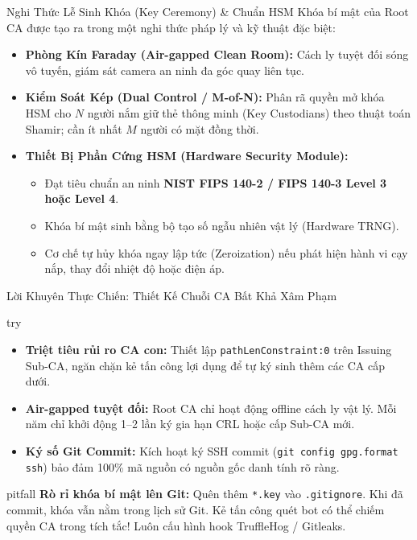 \begin{frame}{Nghi Thức Lễ Sinh Khóa (Key Ceremony) \& Chuẩn HSM}
  Khóa bí mật của Root CA được tạo ra trong một nghi thức pháp lý và kỹ thuật đặc biệt:
  \begin{itemize}\small
    \item \textbf{Phòng Kín Faraday (Air-gapped Clean Room):} Cách ly tuyệt đối sóng vô tuyến, giám sát camera an ninh đa góc quay liên tục.
    \item \textbf{Kiểm Soát Kép (Dual Control / M-of-N):} Phân rã quyền mở khóa HSM cho $N$ người nắm giữ thẻ thông minh (Key Custodians) theo thuật toán Shamir; cần ít nhất $M$ người có mặt đồng thời.
    \item \textbf{Thiết Bị Phần Cứng HSM (Hardware Security Module):}
      \begin{itemize}\footnotesize
        \item Đạt tiêu chuẩn an ninh \textbf{NIST FIPS 140-2 / FIPS 140-3 Level 3 hoặc Level 4}.
        \item Khóa bí mật sinh bằng bộ tạo số ngẫu nhiên vật lý (Hardware TRNG).
        \item Cơ chế tự hủy khóa ngay lập tức (Zeroization) nếu phát hiện hành vi cạy nắp, thay đổi nhiệt độ hoặc điện áp.
      \end{itemize}
  \end{itemize}
\end{frame}

\begin{frame}{Lời Khuyên Thực Chiến: Thiết Kế Chuỗi CA Bất Khả Xâm Phạm}
  \begin{beyond}{try}
    \begin{itemize}\footnotesize
      \item \textbf{Triệt tiêu rủi ro CA con:} Thiết lập \texttt{pathLenConstraint:0} trên Issuing Sub-CA, ngăn chặn kẻ tấn công lợi dụng để tự ký sinh thêm các CA cấp dưới.
      \item \textbf{Air-gapped tuyệt đối:} Root CA chỉ hoạt động offline cách ly vật lý. Mỗi năm chỉ khởi động 1--2 lần ký gia hạn CRL hoặc cấp Sub-CA mới.
      \item \textbf{Ký số Git Commit:} Kích hoạt ký SSH commit (\texttt{git config gpg.format ssh}) bảo đảm 100\% mã nguồn có nguồn gốc danh tính rõ ràng.
    \end{itemize}
  \end{beyond}

  \begin{beyond}{pitfall}
    \footnotesize
    \textbf{Rò rỉ khóa bí mật lên Git:} Quên thêm \texttt{*.key} vào \texttt{.gitignore}. Khi đã commit, khóa vẫn nằm trong lịch sử Git. Kẻ tấn công quét bot có thể chiếm quyền CA trong tích tắc! Luôn cấu hình hook TruffleHog / Gitleaks.
  \end{beyond}
\end{frame}

